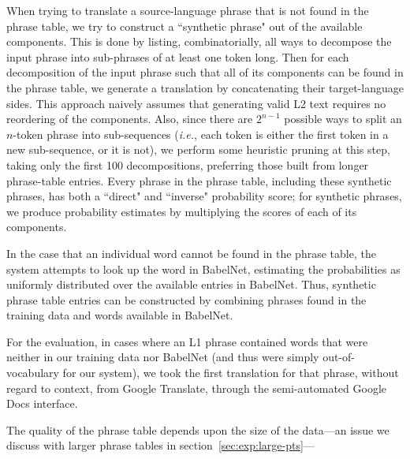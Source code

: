 \documentclass[11pt]{article}
\begin{document}
When trying to translate a source-language phrase that is not found in the
phrase table, we try to construct a ``synthetic phrase" out of the available
components. This is done by listing, combinatorially, all ways to decompose the
input phrase into sub-phrases of at least one token long. Then for each
decomposition of the input phrase such that all of its components can be found
in the phrase table, we generate a translation by concatenating their
target-language sides. This approach naively assumes that generating valid L2
text requires no reordering of the components. Also, since there are $2^{n-1}$
possible ways to split an $n$-token phrase into sub-sequences (\textit{i.e.},
each token is either the first token in a new sub-sequence, or it is not), we
perform some heuristic pruning at this step, taking only the first 100
decompositions, preferring those built from longer phrase-table entries. Every
phrase in the phrase table, including these synthetic phrases, has both a
``direct" and ``inverse" probability score; for synthetic phrases, we produce
probability estimates by multiplying the scores of each of its components.

In the case that an individual word cannot be found in the phrase table, the
system attempts to look up the word in BabelNet, estimating the probabilities
as uniformly distributed over the available entries in BabelNet. Thus,
synthetic phrase table entries can be constructed by combining phrases found in
the training data and words available in BabelNet.

For the evaluation, in cases where an L1 phrase contained words that were
neither in our training data nor BabelNet (and thus were simply
out-of-vocabulary for our system), we took the first translation for that
phrase, without regard to context, from Google Translate, through the
semi-automated Google Docs interface. %
%

The quality of the phrase table depends upon the size of the data---an issue we
discuss with larger phrase tables in section~\ref{sec:exp:large-pts}---
\end{document}
